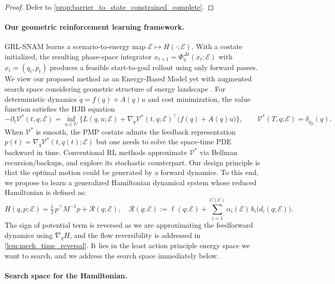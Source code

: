 \documentclass{article} %
\begin{document}
\begin{proof}
Defer to \cref{prop:barrier_to_state_constrained_complete}.
\end{proof}

\paragraph{Our geometric reinforcement learning framework.}

GRL-SNAM {learns} a scenario-to-energy map $\mathcal E\mapsto H(\cdot;\mathcal E)$. With a costate initialized, the resulting phase-space integrator
$x_{t+1}=\Phi_{\eta}^{\Delta t}(x_t;\mathcal E)$ with $x_t=(q_t,p_t)$ produces a feasible start-to-goal rollout using only forward passes. We view our proposed method as an Energy-Based Model \citep{hopfield1982neural,ackley1985learning,lecun2006tutorial} yet with augmented search space considering geometric structure of energy landscape \citep{nguyen2025stochastic, ryan2025bayesian, mclennan2025learning}. For deterministic dynamics $\dot q=f(q)+A(q)u$ and cost minimization, the value function satisfies the HJB equation
\[
-\partial_t \mathcal V^{*}(t,q;\mathcal E)
=\inf_{u\in U}\Big\{L(q,u;\mathcal E)+\nabla_q\mathcal V^{*}(t,q;\mathcal E)^\top\big(f(q)+A(q)u\big)\Big\},
\qquad
\mathcal V^{*}(T,q;\mathcal E)=\delta_{q_T}(q).
\]
When $\mathcal V^{*}$ is smooth, the PMP costate admits the feedback representation
$p(t)=\nabla_q\mathcal V^{*}(t,q(t);\mathcal E)$ but one needs to solve the space-time PDE backward in time.
Conventional RL methods approximate $\mathcal V^{*}$ via Bellman recursion/backups, and explore its stochastic counterpart. Our design principle is that the optimal motion could be generated by a forward dynamics. To this end, we propose to learn a generalized Hamiltonian dynamical system whose reduced Hamiltonian is defined as:
\begin{equation}
\label{eq:def:reduced:hamiltonian:grl-snam}
H(q,p;\mathcal E)
=\tfrac12\,p^\top M^{-1}p + \mathcal{R}(q;\mathcal E),
\quad
\mathcal{R}(q;\mathcal E)
:= \ell(q;\mathcal E)+\sum_{i=1}^{C(\mathcal E)} \alpha_i(\mathcal E)\, b_i\!\big(d_i(q;\mathcal E)\big).
\end{equation}
The sign of potential term is reversed as we are approximating the feedforward dynamics using $\nabla_q H$, and the flow reversibility is addressed in \cref{lem:mech_time_reversal}. It lies in the least action principle energy space we want to search, and we address the search space immediately below. 


\paragraph{Search space for the Hamiltonian.}
\end{document}
